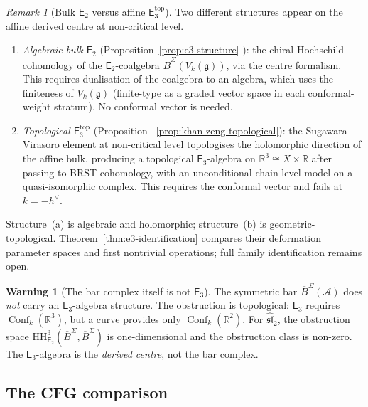 \documentclass[11pt,reqno]{amsart}
\theoremstyle{definition}
\newtheorem{warning}[theorem]{Warning}
\theoremstyle{remark}
\newtheorem{remark}[theorem]{Remark}
\newcommand{\cA}{\mathcal{A}}
\newcommand{\HH}{\mathrm{HH}}
\newcommand{\Etwo}{\mathsf{E}_{2}}
\providecommand{\Ethree}{\mathsf{E}_{3}}
\DeclareMathOperator{\Conf}{Conf}
\newcommand{\fg}{\mathfrak{g}}
\newcommand{\BarSig}{\overline{B}^{\Sigma}}
\newcommand{\RR}{\mathbb{R}}
\numberwithin{equation}{section}
\begin{document}
\begin{remark}[Bulk $\Etwo$ versus affine
$\Ethree^{\mathrm{top}}$]
\label{rem:two-e3}
Two different structures appear on the affine derived
centre at non-critical level.
\begin{enumerate}[label=\textup{(\alph*)}]
\item \emph{Algebraic bulk $\Etwo$}
  \textup{(}Proposition~\textup{\ref{prop:e3-structure}}%
  \textup{)}: the chiral Hochschild cohomology of the
  $\Etwo$-coalgebra $\BarSig(V_k(\fg))$, via the
  centre formalism. This requires dualisation of the
  coalgebra to an algebra, which uses the finiteness of
  $V_k(\fg)$ \textup{(}finite-type as a graded vector space
  in each conformal-weight stratum\textup{)}. No conformal
  vector is needed.
\item \emph{Topological $\Ethree^{\mathrm{top}}$}
  \textup{(}Proposition~%
  \textup{\ref{prop:khan-zeng-topological}}\textup{)}:
  the Sugawara Virasoro element at non-critical level
  topologises the holomorphic direction of the affine bulk,
  producing a topological $\Ethree$-algebra on
  $\RR^3 \cong X \times \RR$ after passing to BRST
  cohomology, with an unconditional chain-level model on a
  quasi-isomorphic complex.
  This requires the conformal vector and fails at
  $k = -h^\vee$.
\end{enumerate}
Structure~\textup{(a)} is algebraic and holomorphic;
structure~\textup{(b)} is geometric-topological.
Theorem~\textup{\ref{thm:e3-identification}} compares their
deformation parameter spaces and first nontrivial
operations; full family identification remains open.
\end{remark}

\begin{warning}[The bar complex itself is not $\Ethree$]
\label{warn:bar-not-e3}
The symmetric bar $\BarSig(\cA)$ does \emph{not} carry
an $\Ethree$-algebra structure. The obstruction is
topological: $\Ethree$ requires $\Conf_k(\RR^3)$, but a
curve provides only $\Conf_k(\RR^2)$. For
$\widehat{\mathfrak{sl}}_2$, the obstruction space
$\HH^3_{\Etwo}(\BarSig, \BarSig)$ is one-dimensional
and the obstruction class is non-zero. The
$\Ethree$-algebra is the \emph{derived centre}, not the
bar complex.
\end{warning}


\subsection{The CFG comparison}
\label{subsec:cfg}
\end{document}
